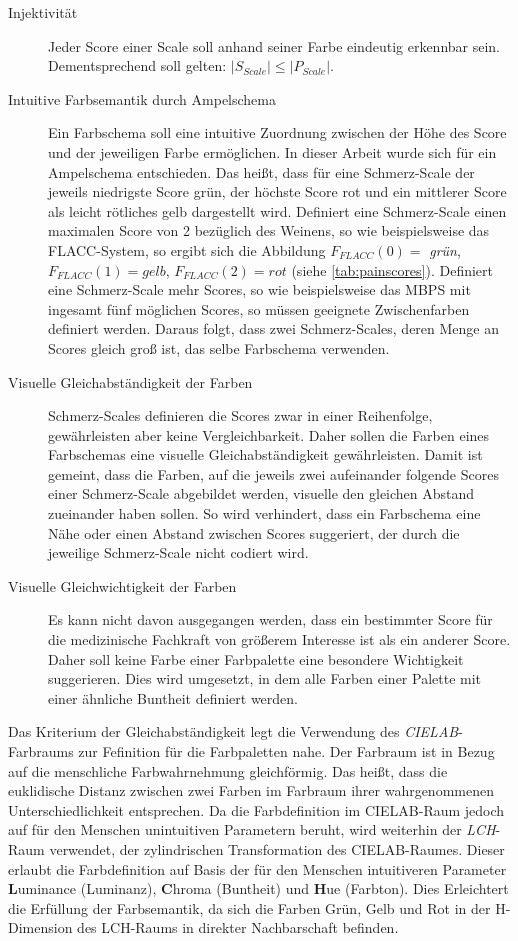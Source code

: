 \begin{description}
\item[Injektivität] Jeder Score einer Scale soll anhand seiner Farbe eindeutig erkennbar sein. Dementsprechend soll gelten: $|S_{Scale}| \leq |P_{Scale}|$.
\item[Intuitive Farbsemantik durch Ampelschema] Ein Farbschema soll eine intuitive Zuordnung zwischen der Höhe des Score und der jeweiligen Farbe ermöglichen. In dieser Arbeit wurde sich für ein Ampelschema entschieden. Das heißt, dass für eine Schmerz-Scale der jeweils niedrigste Score \glqq grün\grqq{}, der höchste Score \glqq rot\grqq{} und ein \glqq mittlerer\grqq{} Score als \glqq leicht rötliches gelb\grqq{} dargestellt wird. Definiert eine Schmerz-Scale einen maximalen Score von 2 bezüglich des Weinens, so wie beispielsweise das FLACC-System, so ergibt sich die Abbildung $F_{FLACC}(0) = $ \emph{grün}, $F_{FLACC}(1) = gelb$, $F_{FLACC}(2) = rot$ (siehe \autoref{tab:painscores}). Definiert eine Schmerz-Scale mehr Scores, so wie beispielsweise das MBPS mit ingesamt fünf möglichen Scores, so müssen geeignete Zwischenfarben definiert werden. Daraus folgt, dass zwei Schmerz-Scales, deren Menge an Scores gleich groß ist, das selbe Farbschema verwenden.
\item[Visuelle Gleichabständigkeit der Farben] Schmerz-Scales definieren die Scores zwar in einer Reihenfolge, gewährleisten aber keine Vergleichbarkeit. Daher sollen die Farben eines Farbschemas eine \glqq visuelle Gleichabständigkeit\grqq{} gewährleisten. Damit ist gemeint, dass die Farben, auf die jeweils zwei aufeinander folgende Scores einer Schmerz-Scale abgebildet werden, visuelle den gleichen Abstand zueinander haben sollen. So wird verhindert, dass ein Farbschema eine Nähe oder einen Abstand zwischen Scores suggeriert, der durch die jeweilige Schmerz-Scale nicht codiert wird. 
\item[Visuelle Gleichwichtigkeit der Farben] Es kann nicht davon ausgegangen werden, dass ein bestimmter Score für die medizinische Fachkraft von größerem Interesse ist als ein anderer Score. Daher soll keine Farbe einer Farbpalette eine besondere Wichtigkeit suggerieren. Dies wird umgesetzt, in dem alle Farben einer Palette mit einer ähnliche Buntheit definiert werden.\cite{bigman}
\end{description}

Das Kriterium der Gleichabständigkeit legt die Verwendung des \emph{CIELAB}-Farbraums zur Fefinition für die Farbpaletten nahe. Der Farbraum ist in Bezug auf die menschliche Farbwahrnehmung \glqq gleichförmig\grqq. Das heißt, dass die euklidische Distanz zwischen zwei Farben im Farbraum ihrer wahrgenommenen Unterschiedlichkeit entsprechen. Da die Farbdefinition im CIELAB-Raum jedoch auf für den Menschen unintuitiven Parametern beruht, wird weiterhin der \emph{LCH}-Raum verwendet, der zylindrischen Transformation des CIELAB-Raumes. Dieser erlaubt die Farbdefinition auf Basis der für den Menschen intuitiveren Parameter \textbf{L}uminance (Luminanz), \textbf{C}hroma (Buntheit) und \textbf{H}ue (Farbton). Dies Erleichtert die Erfüllung der Farbsemantik, da sich die Farben Grün, Gelb und Rot in der H-Dimension des LCH-Raums in direkter Nachbarschaft befinden.\cite[S. 2-3]{palettes}\cite{johnstone}

